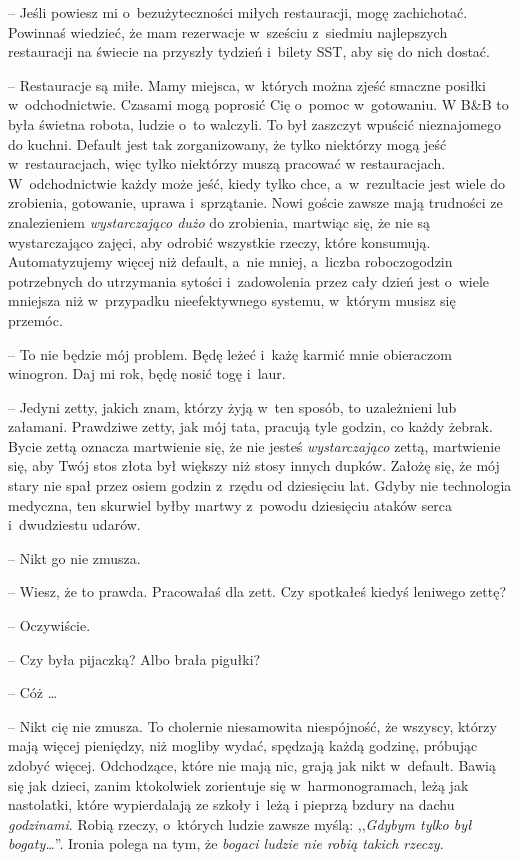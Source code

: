 \documentclass[oneside,polish,11pt,sfheadings]{mwbk}
\begin{document}
-- Jeśli powiesz mi o~bezużyteczności miłych restauracji, mogę
zachichotać. Powinnaś wiedzieć, że mam rezerwacje w~sześciu z~siedmiu
najlepszych restauracji na świecie na przyszły tydzień i~bilety SST, aby
się do nich dostać.

-- Restauracje są miłe. Mamy miejsca, w~których można zjeść smaczne
posiłki w~odchodnictwie. Czasami mogą poprosić Cię o~pomoc w~gotowaniu.
W B\&B to była świetna robota, ludzie o~to walczyli. To był zaszczyt
wpuścić nieznajomego do kuchni. Default jest tak zorganizowany, że tylko
niektórzy mogą jeść w~restauracjach, więc tylko niektórzy muszą pracować
w restauracjach. W~odchodnictwie każdy może jeść, kiedy tylko chce, a~w~rezultacie jest wiele do zrobienia, gotowanie, uprawa i~sprzątanie. Nowi
goście zawsze mają trudności ze znalezieniem \textit{wystarczająco dużo}
do zrobienia, martwiąc się, że nie są wystarczająco zajęci, aby odrobić
wszystkie rzeczy, które konsumują. Automatyzujemy więcej niż default, a~nie mniej, a~liczba roboczogodzin potrzebnych do utrzymania sytości i~zadowolenia przez cały dzień jest o~wiele mniejsza niż w~przypadku
nieefektywnego systemu, w~którym musisz się przemóc.

-- To nie będzie mój problem. Będę leżeć i~każę karmić mnie obieraczom
winogron. Daj mi rok, będę nosić togę i~laur.

-- Jedyni zetty, jakich znam, którzy żyją w~ten sposób, to uzależnieni
lub załamani. Prawdziwe zetty, jak mój tata, pracują tyle godzin, co
każdy żebrak. Bycie zettą oznacza martwienie się, że nie jesteś
\textit{wystarczająco }zettą, martwienie się, aby Twój stos złota był
większy niż stosy innych dupków. Założę się, że mój stary nie spał przez
osiem godzin z~rzędu od dziesięciu lat. Gdyby nie technologia medyczna,
ten skurwiel byłby martwy z~powodu dziesięciu ataków serca i~dwudziestu
udarów.

-- Nikt go nie zmusza.

-- Wiesz, że to prawda. Pracowałaś dla zett. Czy spotkałeś kiedyś
leniwego zettę?

-- Oczywiście.

-- Czy była pijaczką? Albo brała pigułki?

-- Cóż \ldots 

-- Nikt cię nie zmusza. To cholernie niesamowita niespójność, że wszyscy,
którzy mają więcej pieniędzy, niż mogliby wydać, spędzają każdą godzinę,
próbując zdobyć więcej. Odchodzące, które nie mają nic, grają jak nikt w~default. Bawią się jak dzieci, zanim ktokolwiek zorientuje się w~harmonogramach, leżą jak nastolatki, które wypierdalają ze szkoły i~leżą
i pieprzą bzdury na dachu \textit{godzinami}. Robią rzeczy, o~których
ludzie zawsze myślą: ,,\textit{Gdybym tylko był bogaty\ldots }''. Ironia
polega na tym, że \textit{bogaci ludzie nie robią takich rzeczy}.
\end{document}
